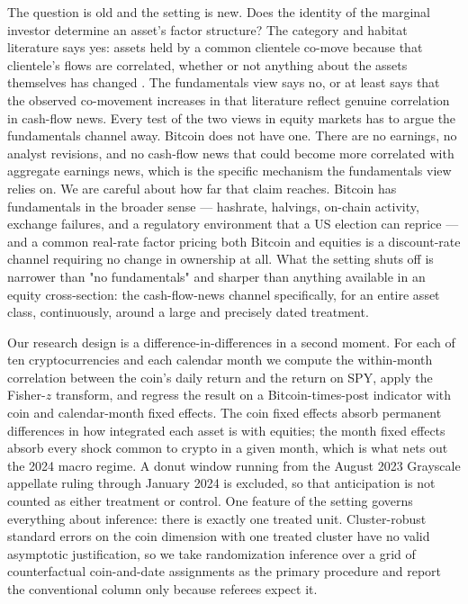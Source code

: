 \documentclass[12pt,a4paper]{article}
\begin{document}
The question is old and the setting is new. Does the identity of the marginal investor determine an asset's factor structure? The category and habitat literature says yes: assets held by a common clientele co-move because that clientele's flows are correlated, whether or not anything about the assets themselves has changed \citep{barberis2003style,barberis2004comovement}. The fundamentals view says no, or at least says that the observed co-movement increases in that literature reflect genuine correlation in cash-flow news. Every test of the two views in equity markets has to argue the fundamentals channel away. Bitcoin does not have one. There are no earnings, no analyst revisions, and no cash-flow news that could become more correlated with aggregate earnings news, which is the specific mechanism the fundamentals view relies on. We are careful about how far that claim reaches. Bitcoin has fundamentals in the broader sense — hashrate, halvings, on-chain activity, exchange failures, and a regulatory environment that a US election can reprice — and a common real-rate factor pricing both Bitcoin and equities is a discount-rate channel requiring no change in ownership at all. What the setting shuts off is narrower than "no fundamentals" and sharper than anything available in an equity cross-section: the cash-flow-news channel specifically, for an entire asset class, continuously, around a large and precisely dated treatment.

Our research design is a difference-in-differences in a second moment. For each of ten cryptocurrencies and each calendar month we compute the within-month correlation between the coin's daily return and the return on SPY, apply the Fisher-$z$ transform, and regress the result on a Bitcoin-times-post indicator with coin and calendar-month fixed effects. The coin fixed effects absorb permanent differences in how integrated each asset is with equities; the month fixed effects absorb every shock common to crypto in a given month, which is what nets out the 2024 macro regime. A donut window running from the August 2023 Grayscale appellate ruling through January 2024 is excluded, so that anticipation is not counted as either treatment or control. One feature of the setting governs everything about inference: there is exactly one treated unit. Cluster-robust standard errors on the coin dimension with one treated cluster have no valid asymptotic justification, so we take randomization inference over a grid of counterfactual coin-and-date assignments as the primary procedure and report the conventional column only because referees expect it.
\end{document}
